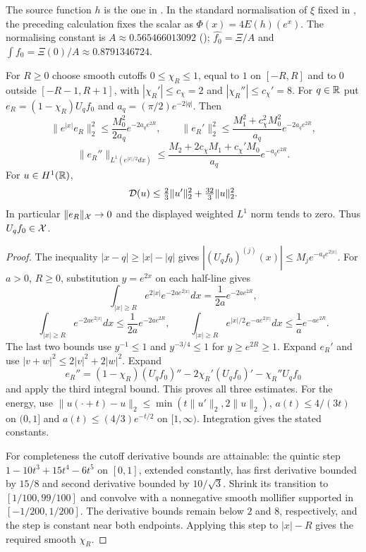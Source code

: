 The source function $h$ is the one in
\cite[(7.1)--(7.2), Lemma 7.1]{CCM-ZST-2025}. In the standard
normalisation of $\xi$ fixed in , the preceding
calculation fixes the scalar as $\Phi(x)=4E(h)(e^x)$. The normalising constant is
$A\approx0.565466013092$ (); $\widehat{f_0}=\Xi/A$ and $\int f_0=\Xi(0)/A\approx0.8791346724$.

\begin{lemma}\label{lem:cutoffnorm}
For $R\ge0$ choose smooth cutoffs $0\le\chi_R\le1$, equal to $1$
on $[-R,R]$ and to $0$ outside $[-R-1,R+1]$, with
$|\chi_R'|\le c_\chi=2$ and $|\chi_R''|\le c_\chi'=8$.
For $q\in\mathbb R$ put $e_R=(1-\chi_R)U_qf_0$ and
$a_q=(\pi/2)e^{-2|q|}$. Then
\[
 \|e^{|x|}e_R\|_2^2
 \le\frac{M_0^2}{2a_q}e^{-2a_qe^{2R}},\qquad
 \|e_R'\|_2^2
 \le\frac{M_1^2+c_\chi^2M_0^2}{a_q}e^{-2a_qe^{2R}},
\]
\[
 \|e_R''\|_{L^1(e^{|x|/2}dx)}
 \le\frac{M_2+2c_\chi M_1+c_\chi'M_0}{a_q}
          e^{-a_qe^{2R}}.
\]
For $u\in H^1(\mathbb R)$,
\[
 \mathcal D(u)\le\tfrac23\|u'\|_2^2+\tfrac{32}3\|u\|_2^2.
\]
In particular $\|e_R\|_{\mathcal X}\to0$ and the displayed weighted
$L^1$ norm tends to zero. Thus $U_qf_0\in\mathcal X$.
\end{lemma}
\begin{proof}
The inequality $|x-q|\ge|x|-|q|$ gives
$|(U_qf_0)^{(j)}(x)|\le M_j e^{-a_qe^{2|x|}}$.
For $a>0$, $R\ge0$, substitution $y=e^{2x}$ on each half-line gives
\[
 \int_{|x|\ge R}e^{2|x|}e^{-2ae^{2|x|}}dx
       =\frac1{2a}e^{-2ae^{2R}},
\]
\[
 \int_{|x|\ge R}e^{-2ae^{2|x|}}dx
       \le\frac1{2a}e^{-2ae^{2R}},\qquad
 \int_{|x|\ge R}e^{|x|/2}e^{-ae^{2|x|}}dx
       \le\frac1a e^{-ae^{2R}}.
\]
The last two bounds use $y^{-1}\le1$ and $y^{-3/4}\le1$ for
$y\ge e^{2R}\ge1$. Expand $e_R'$ and use
$|v+w|^2\le2|v|^2+2|w|^2$. Expand
\[
 e_R''=(1-\chi_R)(U_qf_0)''
          -2\chi_R'(U_qf_0)'-\chi_R''U_qf_0
\]
and apply the third integral bound. This proves all three estimates.
For the energy, use
$\|u(\cdot+t)-u\|_2\le\min(t\|u'\|_2,2\|u\|_2)$,
$a(t)\le4/(3t)$ on $(0,1]$ and
$a(t)\le(4/3)e^{-t/2}$ on $[1,\infty)$.
Integration gives the stated constants.

For completeness the cutoff derivative bounds are attainable: the
quintic step $1-10t^3+15t^4-6t^5$ on $[0,1]$, extended constantly,
has first derivative bounded by $15/8$ and second derivative bounded
by $10/\sqrt3$. Shrink its transition to $[1/100,99/100]$ and
convolve with a nonnegative smooth mollifier supported in
$[-1/200,1/200]$. The derivative bounds remain below $2$ and $8$,
respectively, and the step is constant near both endpoints. Applying
this step to $|x|-R$ gives the required smooth $\chi_R$.
\end{proof}

